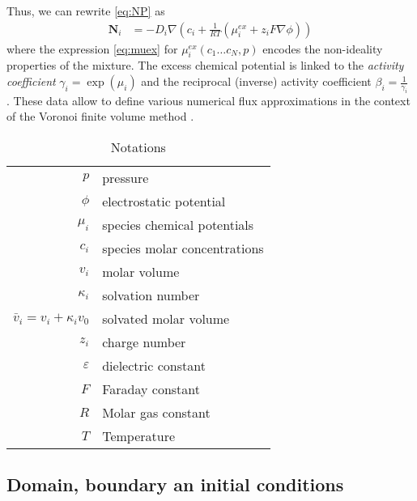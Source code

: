 \documentclass[12pt,oneside,reqno]{amsart}
\numberwithin{equation}{section}
\begin{document}
Thus, we can rewrite \eqref{eq:NP}  as 
\begin{align}
  \mathbf N_i &= - D_i\nabla\left( c_i + \frac{1}{RT} (\mu_i^{ex} + z_i F \nabla \phi) \right)
\end{align}
where the expression \eqref{eq:muex} for $\mu_i^{ex}(c_1\dots c_N, p)$  encodes the non-ideality properties of the mixture.
The excess chemical potential is linked to the \textit{activity coefficient} $\gamma_i=\exp(\mu_i)$ and the
reciprocal (inverse) activity coefficient $\beta_i=\frac1{\gamma_i}$  \cite{Fuhrmann2015}.
These data allow to define various numerical flux approximations in the context of the Voronoi finite volume
method \cite{Fuhrmann2015,GaudeulFuhrmannNM2022}.

\begin{table}
  \begin{tabular}{rl}
    $p$ & pressure\\
    $\phi $ &electrostatic potential\\
    $\mu_i$& species chemical potentials\\
    $c_i$& species molar concentrations\\
    $v_i$ & molar volume\\
    $\kappa_i$ & solvation number\\
    $\bar v_i = v_i + \kappa_i v_0$ & solvated molar volume\\
    $z_i$ & charge number\\
    $\varepsilon$& dielectric constant\\
    $F$ & Faraday constant\\
    $R$ & Molar gas constant\\
    $T$ & Temperature
\end{tabular}
  \caption{Notations}
  \label{tab:notations}
\end{table}

\subsection{Domain, boundary an initial conditions} 
\end{document}
